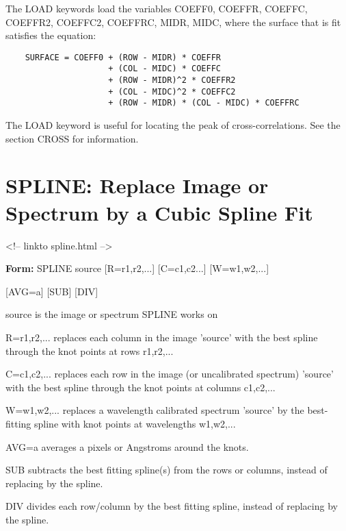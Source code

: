 The LOAD keywords load the variables COEFF0, COEFFR, COEFFC, COEFFR2,
COEFFC2, COEFFRC, MIDR, MIDC, where the surface that is fit satisfies the
equation:
\begin{verbatim}
    SURFACE = COEFF0 + (ROW - MIDR) * COEFFR
                     + (COL - MIDC) * COEFFC
                     + (ROW - MIDR)^2 * COEFFR2
                     + (COL - MIDC)^2 * COEFFC2
                     + (ROW - MIDR) * (COL - MIDC) * COEFFRC
\end{verbatim}
The LOAD keyword is useful for locating the peak of cross-correlations.
See the section CROSS for information.

\section{SPLINE: Replace Image or Spectrum by a Cubic Spline Fit}
\begin{rawhtml}
<!-- linkto spline.html -->
\end{rawhtml}

\begin{command}
  \item[\textbf{Form: } SPLINE source {[R=r1,r2,...]} {[C=c1,c2...]} 
       {[W=w1,w2,...]}\hfill]{}
  \item{{[AVG=a]} {[SUB]} {[DIV]}}
  \item[source]{is the image or spectrum SPLINE works on}
  \item[R=r1,r2,...]{replaces each column in the image 'source'
       with the best spline through the knot points at rows r1,r2,...}
  \item[C=c1,c2,...]{replaces each row in the image (or uncalibrated 
       spectrum) 'source' with the best spline 
       through the knot points at columns c1,c2,...}
  \item[W=w1,w2,...]{replaces a wavelength calibrated spectrum
       'source' by the best-fitting spline with knot
       points at wavelengths w1,w2,...}
  \item[AVG=a]{averages a pixels or Angstroms around the knots.}
  \item[SUB]{subtracts the best fitting spline(s) from the 
       rows or columns, instead of replacing by the spline.}
  \item[DIV]{divides each row/column by the best fitting
       spline, instead of replacing by the spline.}
\end{command}

